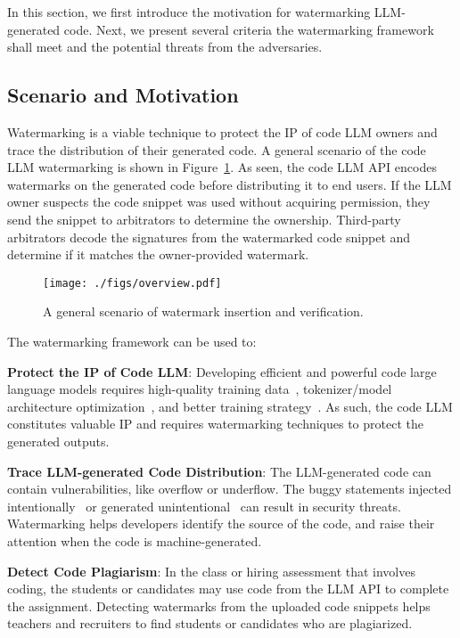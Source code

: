 In this section, we first introduce the motivation for watermarking LLM-generated code. Next, we present several criteria the watermarking framework shall meet and the potential threats from the adversaries. 

\subsection{Scenario and Motivation}
Watermarking is a viable technique to protect the IP of code LLM owners and trace the distribution of their generated code. A general scenario of the code LLM watermarking is shown in Figure~\ref{fig:overview}. As seen, the code LLM API encodes watermarks on the generated code before distributing it to end users. If the LLM owner suspects the code snippet was used without acquiring permission, they send the snippet to arbitrators to determine the ownership. 
Third-party arbitrators decode the signatures from the watermarked code snippet and determine if it matches the owner-provided watermark. 

\begin{figure}[!ht]
    \centering
    \texttt{[image: ./figs/overview.pdf]}
    \caption{A general scenario of watermark insertion and verification.}
    \label{fig:overview}
\end{figure}

The watermarking framework can be used to:

\textbf{Protect the IP of Code LLM}: Developing efficient and powerful code large language models requires high-quality training data~\cite{li2023starcoder,javaheripi2023phi}, tokenizer/model architecture optimization~\cite{liu2023chipnemo,roziere2023code}, and better training strategy~\cite{li2023starcoder,roziere2023code}. 
As such, the code LLM constitutes valuable IP and requires watermarking techniques to protect the generated outputs.


\textbf{Trace LLM-generated Code Distribution}: The LLM-generated code can contain vulnerabilities, like overflow or underflow. The buggy statements injected intentionally~\cite{lee2023wrote} or generated unintentional~\cite{sandoval2023lost} can result in security threats. Watermarking helps developers identify the source of the code, and raise their attention when the code is machine-generated.

\textbf{Detect Code Plagiarism}: In the class or hiring assessment that involves coding, the students or candidates may use code from the LLM API to complete the assignment. Detecting watermarks from the uploaded code snippets helps teachers and recruiters to find students or candidates who are plagiarized. 

